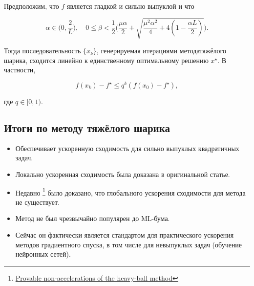 \documentclass[
  russian,
  letterpaper,
  DIV=11,
  numbers=noendperiod]{scrartcl}
\providecommand{\tightlist}{%
  \setlength{\itemsep}{0pt}\setlength{\parskip}{0pt}}
\begin{document}
\begin{tcolorbox}[enhanced jigsaw, rightrule=.15mm, coltitle=black, title=\textcolor{quarto-callout-color}{\faInfo}\hspace{0.5em}{Theorem}, colbacktitle=quarto-callout-color!10!white, opacityback=0, colframe=quarto-callout-color-frame, bottomtitle=1mm, toptitle=1mm, titlerule=0mm, arc=.35mm, leftrule=.75mm, breakable, toprule=.15mm, bottomrule=.15mm, opacitybacktitle=0.6, left=2mm, colback=white]

Предположим, что \(f\) является гладкой и сильно выпуклой и что

\[
\alpha\in\biggl(0,\dfrac{2}{L}\biggr),\quad 0\leq  \beta<\dfrac{1}{2}\biggl( \dfrac{\mu \alpha}{2}+\sqrt{\dfrac{\mu^2\alpha^2}{4}+4(1-\frac{\alpha L}{2})} \biggr) .
\]

Тогда последовательность \(\{x_k\}\), генерируемая итерациями
методатяжёлого шарика, сходится линейно к единственному оптимальному
решению \(x^\star\). В частности,

\[
f(x_{k})-f^\star \leq q^k (f(x_0)-f^\star),
\]

где \(q\in[0,1)\).

\end{tcolorbox}

\subsection{Итоги по методу тяжёлого
шарика}\label{ux438ux442ux43eux433ux438-ux43fux43e-ux43cux435ux442ux43eux434ux443-ux442ux44fux436ux451ux43bux43eux433ux43e-ux448ux430ux440ux438ux43aux430}

\begin{itemize}
\tightlist
\item
  Обеспечивает ускоренную сходимость для сильно выпуклых квадратичных
  задач.
\item
  Локально ускоренная сходимость была доказана в оригинальной статье.
\item
  Недавно \footnote{\href{https://arxiv.org/pdf/2307.11291}{Provable
    non-accelerations of the heavy-ball method}} было доказано, что
  глобального ускорения сходимости для метода не существует.
\item
  Метод не был чрезвычайно популярен до ML-бума.
\item
  Сейчас он фактически является стандартом для практического ускорения
  методов градиентного спуска, в том числе для невыпуклых задач
  (обучение нейронных сетей).
\end{itemize}
\end{document}
